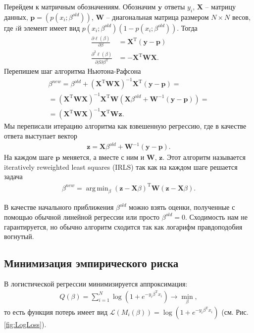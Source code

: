 \documentclass{article}
\DeclareMathOperator*{\argmin}{arg\,min}
\begin{document}
Перейдем к матричным обозначениям. Обозначим $\mathbf{y}$ ответы $y_i$, $\mathbf{X}$ -- матрицу данных, $\mathbf{p} = (p(x_i; \beta^{old}))$, $\mathbf{W}$ -- диагональная матрица размером $N\times N$ весов, где $i$й элемент имеет вид $p(x_i;\beta^{old})(1 - p(x_i; \beta^{old}))$. Тогда
\begin{align*}
    \frac{\partial \ell(\beta)}{\partial \beta} &= \mathbf{X}^\mathrm{T}(\mathbf{y} - \mathbf{p})\\
    \frac{\partial^2 \ell(\beta)}{\partial \beta \partial \beta^{\mathrm{T}}} &= -\mathbf{X}^\mathrm{T}\mathbf{W}\mathbf{X}.
\end{align*}
Перепишем шаг алгоритма Ньютона-Рафсона
\begin{multline*}
  \beta^{new} = \beta^{old} + (\mathbf{X}^\mathrm{T}\mathbf{W}\mathbf{X})^{-1}\mathbf{X}^\mathrm{T}(\mathbf{y} - \mathbf{p}) = \\
  = (\mathbf{X}^\mathrm{T}\mathbf{W}\mathbf{X})^{-1}\mathbf{X}^\mathrm{T}\mathbf{W} (\mathbf{X}\beta^{old} + \mathbf{W}^{-1}(\mathbf{y} - \mathbf{p})) = \\
  = (\mathbf{X}^\mathrm{T}\mathbf{W}\mathbf{X})^{-1}\mathbf{X}^\mathrm{T}\mathbf{W}\mathbf{z}.
\end{multline*}
Мы переписали итерацию алгоритма как взвешенную регрессию, где в качестве ответа выступает вектор
\begin{align*}
  \mathbf{z} = \mathbf{X}\beta^{old} + \mathbf{W}^{-1}(\mathbf{y} - \mathbf{p}).
\end{align*}
На каждом шаге $\mathbf{p}$ меняется, а вместе с ним и $\mathbf{W}$, $\mathbf{z}$. Этот алгоритм называется iteratively reweighted least squares (IRLS) так как на каждом шаге решается задача
\begin{align*}
  \beta^{new} = \argmin_\beta (\mathbf{z} - \mathbf{X}\beta)^\mathrm{T} \mathbf{W}(\mathbf{z} - \mathbf{X}\beta).
\end{align*}

В качестве начального приближения $\beta^{old}$ можно взять оценки, полученные с помощью обычной линейной регрессии или просто $\beta^{old} = 0$. Сходимость нам не гарантируется, но обычно алгоритм сходится так как логарифм правдоподобия вогнутый.

\subsection{Минимизация эмпирического риска}
В логистической регрессии минимизируется аппроксимация:
  \begin{align*}
     Q(\beta) = \sum_{i = 1}^N \log(1 + e^{-y_i\beta^\mathrm{T}x_i}) \rightarrow \min_\beta,
  \end{align*}
то есть функция потерь имеет вид $\mathcal{L}(M_i(\beta)) = \log(1 + e^{-y_i\beta^\mathrm{T}x_i})$ (см. Рис. \ref{fig:LogLoss}).
\end{document}
